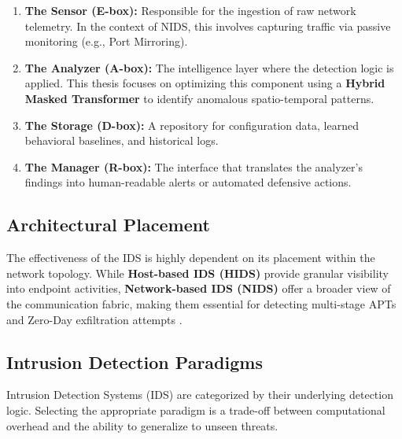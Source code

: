 \documentclass[12pt, a4paper]{report}
\begin{document}
\begin{enumerate}
    \item \textbf{The Sensor (E-box):} Responsible for the ingestion of raw network telemetry. In the context of NIDS, this involves capturing traffic via passive monitoring (e.g., Port Mirroring).
    \item \textbf{The Analyzer (A-box):} The intelligence layer where the detection logic is applied. This thesis focuses on optimizing this component using a \textbf{Hybrid Masked Transformer} to identify anomalous spatio-temporal patterns.
    \item \textbf{The Storage (D-box):} A repository for configuration data, learned behavioral baselines, and historical logs.
    \item \textbf{The Manager (R-box):} The interface that translates the analyzer's findings into human-readable alerts or automated defensive actions.
\end{enumerate}

\subsection{Architectural Placement}
The effectiveness of the IDS is highly dependent on its placement within the network topology. While \textbf{Host-based IDS (HIDS)} provide granular visibility into endpoint activities, \textbf{Network-based IDS (NIDS)} offer a broader view of the communication fabric, making them essential for detecting multi-stage APTs and Zero-Day exfiltration attempts \cite{khraisat2019survey}.


\subsection{Intrusion Detection Paradigms}
Intrusion Detection Systems (IDS) are categorized by their underlying detection logic. Selecting the appropriate paradigm is a trade-off between computational overhead and the ability to generalize to unseen threats.
\end{document}
